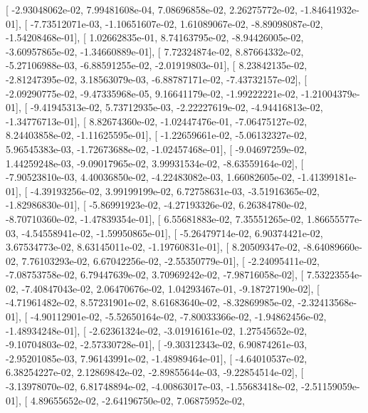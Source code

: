 \documentclass{article}
\begin{document}
       [ -2.93048062e-02,   7.99481608e-04,   7.08696858e-02,
          2.26275772e-02,  -1.84641932e-01],
       [ -7.73512071e-03,  -1.10651607e-02,   1.61089067e-02,
         -8.89098087e-02,  -1.54208468e-01],
       [  1.02662835e-01,   8.74163795e-02,  -8.94426005e-02,
         -3.60957865e-02,  -1.34660889e-01],
       [  7.72324874e-02,   8.87664332e-02,  -5.27106988e-03,
         -6.88591255e-02,  -2.01919803e-01],
       [  8.23842135e-02,  -2.81247395e-02,   3.18563079e-03,
         -6.88787171e-02,  -7.43732157e-02],
       [ -2.09290775e-02,  -9.47335968e-05,   9.16641179e-02,
         -1.99222221e-02,  -1.21004379e-01],
       [ -9.41945313e-02,   5.73712935e-03,  -2.22227619e-02,
         -4.94416813e-02,  -1.34776713e-01],
       [  8.82674360e-02,  -1.02447476e-01,  -7.06475127e-02,
          8.24403858e-02,  -1.11625595e-01],
       [ -1.22659661e-02,  -5.06132327e-02,   5.96545383e-03,
         -1.72673688e-02,  -1.02457468e-01],
       [ -9.04697259e-02,   1.44259248e-03,  -9.09017965e-02,
          3.99931534e-02,  -8.63559164e-02],
       [ -7.90523810e-03,   4.40036850e-02,  -4.22483082e-03,
          1.66082605e-02,  -1.41399181e-01],
       [ -4.39193256e-02,   3.99199199e-02,   6.72758631e-03,
         -3.51916365e-02,  -1.82986830e-01],
       [ -5.86991923e-02,  -4.27193326e-02,   6.26384780e-02,
         -8.70710360e-02,  -1.47839354e-01],
       [  6.55681883e-02,   7.35551265e-02,   1.86655577e-03,
         -4.54558941e-02,  -1.59950865e-01],
       [ -5.26479714e-02,   6.90374421e-02,   3.67534773e-02,
          8.63145011e-02,  -1.19760831e-01],
       [  8.20509347e-02,  -8.64089660e-02,   7.76103293e-02,
          6.67042256e-02,  -2.55350779e-01],
       [ -2.24095411e-02,  -7.08753758e-02,   6.79447639e-02,
          3.70969242e-02,  -7.98716058e-02],
       [  7.53223554e-02,  -7.40847043e-02,   2.06470676e-02,
          1.04293467e-01,  -9.18727190e-02],
       [ -4.71961482e-02,   8.57231901e-02,   8.61683640e-02,
         -8.32869985e-02,  -2.32413568e-01],
       [ -4.90112901e-02,  -5.52650164e-02,  -7.80033366e-02,
         -1.94862456e-02,  -1.48934248e-01],
       [ -2.62361324e-02,  -3.01916161e-02,   1.27545652e-02,
         -9.10704803e-02,  -2.57330728e-01],
       [ -9.30312343e-02,   6.90874261e-03,  -2.95201085e-03,
          7.96143991e-02,  -1.48989464e-01],
       [ -4.64010537e-02,   6.38254227e-02,   2.12869842e-02,
         -2.89855644e-03,  -9.22854514e-02],
       [ -3.13978070e-02,   6.81748894e-02,  -4.00863017e-03,
         -1.55683418e-02,  -2.51159059e-01],
       [  4.89655652e-02,  -2.64196750e-02,   7.06875952e-02,
\end{document}
